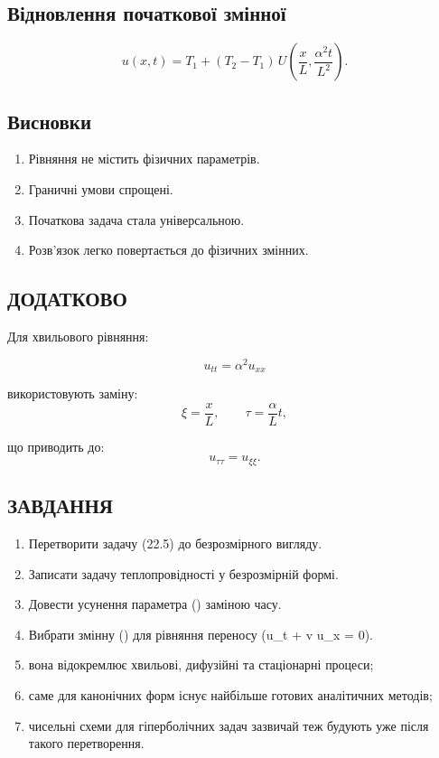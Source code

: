 \documentclass[
  ukrainian,
]{article}
\providecommand{\tightlist}{%
  \setlength{\itemsep}{0pt}\setlength{\parskip}{0pt}}
\begin{document}
\subsection{Відновлення початкової
змінної}\label{ux432ux456ux434ux43dux43eux432ux43bux435ux43dux43dux44f-ux43fux43eux447ux430ux442ux43aux43eux432ux43eux457-ux437ux43cux456ux43dux43dux43eux457}

\[
u(x,t) = T_1 + (T_2 - T_1)\, U\!\left(\frac{x}{L}, \frac{\alpha^2 t}{L^2}\right).
\]

\subsection{Висновки}\label{ux432ux438ux441ux43dux43eux432ux43aux438}

\begin{enumerate}
\def\labelenumi{\arabic{enumi}.}
\tightlist
\item
  Рівняння не містить фізичних параметрів.
\item
  Граничні умови спрощені.
\item
  Початкова задача стала універсальною.
\item
  Розв'язок легко повертається до фізичних змінних.
\end{enumerate}

\subsection{ДОДАТКОВО}\label{ux434ux43eux434ux430ux442ux43aux43eux432ux43e}

Для хвильового рівняння:

\[
u_{tt} = \alpha^2 u_{xx}
\]

використовують заміну: \[
\xi = \frac{x}{L}, \qquad \tau = \frac{\alpha}{L} t,
\]

що приводить до: \[
u_{\tau\tau} = u_{\xi\xi}.
\]

\subsection{ЗАВДАННЯ}\label{ux437ux430ux432ux434ux430ux43dux43dux44f-15}

\begin{enumerate}
\def\labelenumi{\arabic{enumi}.}
\tightlist
\item
  Перетворити задачу (22.5) до безрозмірного вигляду.
\item
  Записати задачу теплопровідності у безрозмірній формі.
\item
  Довести усунення параметра (\alpha) заміною часу.
\item
  Вибрати змінну (\xi) для рівняння переносу (u\_t + v u\_x = 0).
\item
  вона відокремлює хвильові, дифузійні та стаціонарні процеси;
\item
  саме для канонічних форм існує найбільше готових аналітичних методів;
\item
  чисельні схеми для гіперболічних задач зазвичай теж будують уже після
  такого перетворення.
\end{enumerate}
\end{document}
